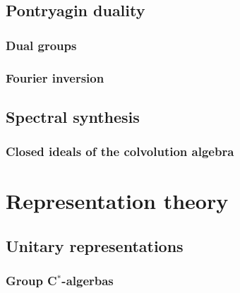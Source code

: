 \documentclass{../../large}
\begin{document}
\chapter{Pontryagin duality}
\section{Dual groups}
\section{}
\section{Fourier inversion}
\begin{prb}
\end{prb}
\begin{prb}
\end{prb}
\begin{prb}
\end{prb}
\begin{prb}
\end{prb}


\chapter{Spectral synthesis}
\section{Closed ideals of the colvolution algebra}








\part{Representation theory}
\chapter{Unitary representations}
\section{}
\begin{prb}
\end{prb}
\section{Group C$^*$-algerbas}
\begin{prb}
\end{prb}
\end{document}
